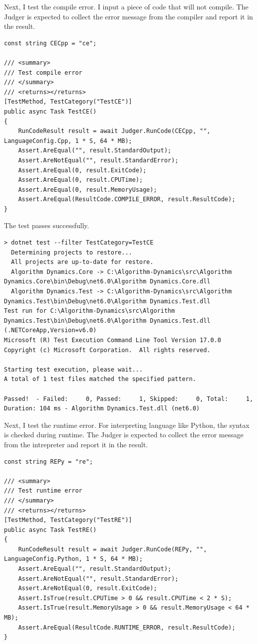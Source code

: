 \documentclass[a4paper]{report}
\begin{document}
Next, I test the compile error. I input a piece of code that will not compile. The Judger is expected to collect the error message from the compiler and report it in the result.

\begin{verbatim}
const string CECpp = "ce";

/// <summary>
/// Test compile error
/// </summary>
/// <returns></returns>
[TestMethod, TestCategory("TestCE")]
public async Task TestCE()
{
    RunCodeResult result = await Judger.RunCode(CECpp, "", LanguageConfig.Cpp, 1 * S, 64 * MB);
    Assert.AreEqual("", result.StandardOutput);
    Assert.AreNotEqual("", result.StandardError);
    Assert.AreEqual(0, result.ExitCode);
    Assert.AreEqual(0, result.CPUTime);
    Assert.AreEqual(0, result.MemoryUsage);
    Assert.AreEqual(ResultCode.COMPILE_ERROR, result.ResultCode);
}
\end{verbatim}

The test passes successfully.

\begin{verbatim}
> dotnet test --filter TestCategory=TestCE
  Determining projects to restore...
  All projects are up-to-date for restore.
  Algorithm Dynamics.Core -> C:\Algorithm-Dynamics\src\Algorithm Dynamics.Core\bin\Debug\net6.0\Algorithm Dynamics.Core.dll
  Algorithm Dynamics.Test -> C:\Algorithm-Dynamics\src\Algorithm Dynamics.Test\bin\Debug\net6.0\Algorithm Dynamics.Test.dll
Test run for C:\Algorithm-Dynamics\src\Algorithm Dynamics.Test\bin\Debug\net6.0\Algorithm Dynamics.Test.dll (.NETCoreApp,Version=v6.0)
Microsoft (R) Test Execution Command Line Tool Version 17.0.0
Copyright (c) Microsoft Corporation.  All rights reserved.

Starting test execution, please wait...
A total of 1 test files matched the specified pattern.

Passed!  - Failed:     0, Passed:     1, Skipped:     0, Total:     1, Duration: 104 ms - Algorithm Dynamics.Test.dll (net6.0)
\end{verbatim}

Next, I test the runtime error. For interpreting language like Python, the syntax is checked during runtime. The Judger is expected to collect the error message from the intrepreter and report it in the result.

\begin{verbatim}
const string REPy = "re";

/// <summary>
/// Test runtime error
/// </summary>
/// <returns></returns>
[TestMethod, TestCategory("TestRE")]
public async Task TestRE()
{
    RunCodeResult result = await Judger.RunCode(REPy, "", LanguageConfig.Python, 1 * S, 64 * MB);
    Assert.AreEqual("", result.StandardOutput);
    Assert.AreNotEqual("", result.StandardError);
    Assert.AreNotEqual(0, result.ExitCode);
    Assert.IsTrue(result.CPUTime > 0 && result.CPUTime < 2 * S);
    Assert.IsTrue(result.MemoryUsage > 0 && result.MemoryUsage < 64 * MB);
    Assert.AreEqual(ResultCode.RUNTIME_ERROR, result.ResultCode);
}
\end{verbatim}
\end{document}
